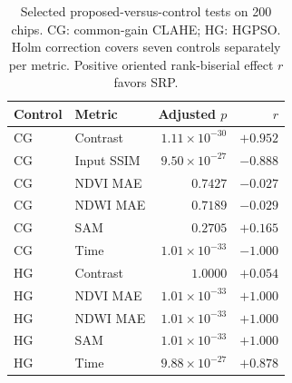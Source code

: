 \begin{table}[t]\centering\footnotesize
\caption{Selected proposed-versus-control tests on 200 chips. CG: common-gain CLAHE; HG: HGPSO. Holm correction covers seven controls separately per metric. Positive oriented rank-biserial effect $r$ favors SRP.}
\label{tab:stats}\begin{tabular}{@{}llrr@{}}\toprule
Control & Metric & Adjusted $p$ & $r$ \\\midrule
CG & Contrast & $1.11\times10^{-30}$ & $+0.952$ \\
CG & Input SSIM & $9.50\times10^{-27}$ & $-0.888$ \\
CG & NDVI MAE & $0.7427$ & $-0.027$ \\
CG & NDWI MAE & $0.7189$ & $-0.029$ \\
CG & SAM & $0.2705$ & $+0.165$ \\
CG & Time & $1.01\times10^{-33}$ & $-1.000$ \\
HG & Contrast & $1.0000$ & $+0.054$ \\
HG & NDVI MAE & $1.01\times10^{-33}$ & $+1.000$ \\
HG & NDWI MAE & $1.01\times10^{-33}$ & $+1.000$ \\
HG & SAM & $1.01\times10^{-33}$ & $+1.000$ \\
HG & Time & $9.88\times10^{-27}$ & $+0.878$ \\
\bottomrule\end{tabular}\end{table}
